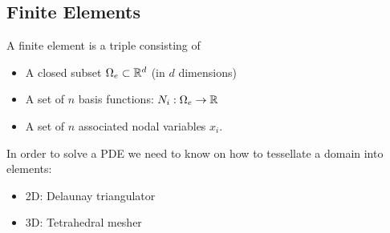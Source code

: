 \begin{multicols}{2}
\subsection{Finite Elements}
A finite element is a triple consisting of 
\begin{itemize}
	\item A closed subset $\Omega_e \subset \mathbb{R}^d$ (in $d$ dimensions)
	\item A set of $n$ basis functions: $N_i: \Omega_e \rightarrow \mathbb{R}$
	\item A set of $n$ associated nodal variables $x_i$.
\end{itemize}
In order to solve a PDE we need to know on how to tessellate a domain into elements:
\begin{itemize}
	\item 2D: Delaunay triangulator
	\item 3D: Tetrahedral mesher
\end{itemize}








\end{multicols}